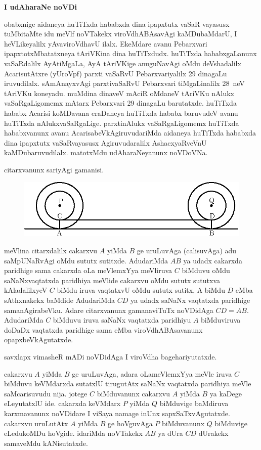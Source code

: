 {\bf I udAharaNe noVDi}

obabxnige aidaneya huTiTxda hababxda dina ipapxtutx vaSaR vayasusx tuMbitaMte idu meVlf noVTakekx viroVdhABAsavAgi kaMDubaMdarU, I heVLikeyalilx yAva\break viroVdhavU ilalx. EkeMdare avanu Pebarxvari ipapxtotxMbatatxneya tAriVKina dina huTiTxdudx. huTiTxda hababxgaLanunx vaSaRdalilx AyAtiMgaLa, AyA tAriVKige anuguNa\-vAgi oMdu deVshadalilx AcarisutAtxre (yUroVpf) parxti vaSaRvU Pebarxvariyalilx {\rm 29} dinagaLu iruvudilalx. sAmAnayxvAgi parxtivaSaRvU Pebarxvari tiMgaLinalilx {\rm 28}~neV tAriVKu koneyadu. muMdina dinaveV mAciR oMdaneV tAriVKu nAlukx vaSaRgaLigomemx mAtarx Pebarxvari {\rm 29} dinagaLu barutatxde. huTiTxda hababx Acarisi koMDavana eraDaneya huTiTxda hababx baruvudeV avanu huTiTxda nAlukxvaSaRgaLige. parxtinAlukx vaSaRgaLigomemx huTiTxda hababxvanunx avanu AcarisabeVkAgiruvudariMda aidaneya huTiTxda hababxda dina ipapxtutx vaSaRvayasusx Agiruvudaralilx AshacxyaRveVnU kaMDubaruvudilalx. matotxMdu udAharaNeyanunx noVDoVNa.

citarxvanunx sariyAgi gamanisi.
\begin{figure}[H]
\centering
\includegraphics[scale=.7]{src/figures/083.eps}
\end{figure}

meVlina citarxdalilx cakarxvu $A$ yiMda $B$ ge uruLuvAga (calisuvAga) adu saMpUNaRvAgi oMdu sututx sutitxde. AdudariMda $AB$ ya udadx cakarxda paridhige sama cakarxda oLa meVlemxYya meVliruva $C$ biMduvu oMdu saNaNxvaqtatxda paridhiya meVlide cakarxvu oMdu sututx sututxva kAladalilxyeV $C$ biMdu iruva vaqtatxvU oMdu sututx sutitx, A biMdu $D$ eMba sAthxnakekx baMdide AdudariMda $CD$ ya udadx saNaNx vaqtatxda paridhige samanAgirabeVku. Adare citarxvanunx gamanaviTuTx noVDidAga $CD=AB$. AdudariMda $C$ biMduvu iruva saNaNx vaqtatxda paridhiyu $A$ biMduviruva doDaDx vaqtatxda paridhige sama eMba viroVdhABAsavanunx opapxbeVkAgutatxde.

savxlapx vimasheR mADi noVDidAga I viroVdha bagehariyutatxde.

cakarxvu $A$ yiMda $B$ ge uruLuvAga, adara oLameVlemxYya meVle iruva $C$ biMduvu keVMdarxda sutatxlU tirugutAtx saNaNx vaqtatxda paridhiya meVle saMcarisuvudu nija. jotege $C$ biMduvanunx cakarxvu $A$ yiMda $B$ ya kaDege eLeyutatxlU ide. cakarxda keVMdarx $P$ yiMda $Q$ biMduvige baMdiruva karxmavanunx noVDidare I viSaya namage inUnx sapxSaTxvAgutatxde. cakarxvu uruLutAtx $A$ yiMda $B$ ge hoVguvAga $P$ biMduvanunx $Q$ biMduvige eLedukoMDu hoVgide. idariMda noVTakekx $AB$ ya dUra $CD$ dUrakekx samaveMdu kANisutatxde. 

